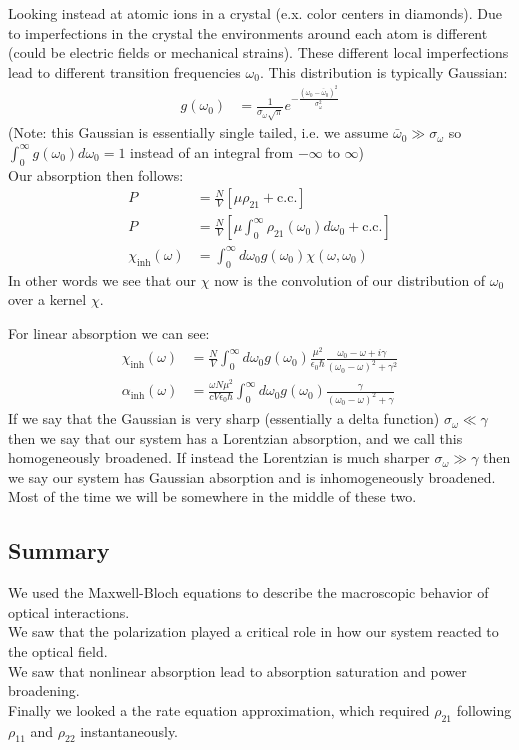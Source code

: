 Looking instead at atomic ions in a crystal (e.x. color centers in diamonds). Due to imperfections in the crystal the environments around each atom is different (could be electric fields or mechanical strains).
These different local imperfections lead to different transition frequencies $\omega_0$. This distribution is typically Gaussian:
\begin{align*}
	g(\omega_0) &= \frac{1}{\sigma_\omega \sqrt{\pi}} e ^{-\frac{(\omega_0 - \bar{\omega}_0)^2}{\sigma_\omega^2}}
\end{align*}
(Note: this Gaussian is essentially single tailed, i.e. we assume $\bar{\omega}_0\gg\sigma_\omega$ so $\int_0^\infty g(\omega_0) d\omega_0 = 1$ instead of an integral from $-\infty$ to $\infty$) \\
Our absorption then follows:
\begin{align*}
	P &= \frac{N}{V}\left[\mu\rho_{21} + \text{c.c.}\right] \\
	P &= \frac{N}{V}\left[\mu\int_0^\infty\rho_{21}(\omega_0)d\omega_0 + \text{c.c.}\right] \\
	\chi_\text{inh}(\omega) &= \int_0^\infty d\omega_0 g(\omega_0) \chi(\omega,\omega_0)
\end{align*}
In other words we see that our $\chi$ now is the convolution of our distribution of $\omega_0$ over a kernel $\chi$.

For linear absorption we can see:
\begin{align*}
	\chi_\text{inh}(\omega) &= \frac{N}{V} \int_0^\infty d\omega_0 g(\omega_0) \frac{\mu^2}{\epsilon_0\hbar} \frac{\omega_0 - \omega + i\gamma}{(\omega_0 - \omega)^2 + \gamma^2} \\
	\alpha_\text{inh}(\omega) &=  \frac{\omega N \mu^2}{c V \epsilon_0\hbar} \int_0^\infty d\omega_0 g(\omega_0) \frac{\gamma}{(\omega_0-\omega)^2 + \gamma}
\end{align*}
If we say that the Gaussian is very sharp (essentially a delta function) $\sigma_\omega \ll \gamma$ then we say that our system has a Lorentzian absorption, and we call this homogeneously broadened.
If instead the Lorentzian is much sharper $\sigma_\omega \gg \gamma$ then we say our system has Gaussian absorption and is inhomogeneously broadened. Most of the time we will be somewhere in the middle of these two.
\subsection{Summary}
We used the Maxwell-Bloch equations to describe the macroscopic behavior of optical interactions.\\
We saw that the polarization played a critical role in how our system reacted to the optical field. \\
We saw that nonlinear absorption lead to absorption saturation and power broadening. \\
Finally we looked a the rate equation approximation, which required $\rho_{21}$ following $\rho_{11}$ and $\rho_{22}$ instantaneously.
